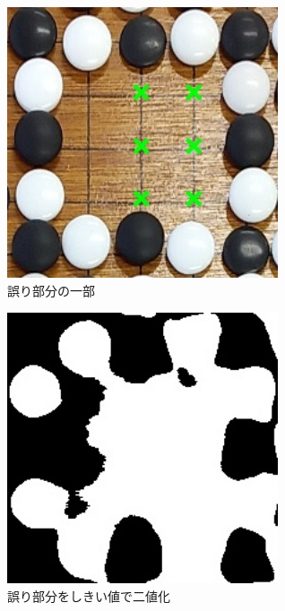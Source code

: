 \documentclass[openright]{nitocs}
\numberwithin{equation}{section}
\begin{document}
                \begin{figure}[tb] %
                    \begin{center}
                    \includegraphics[clip,width=80mm]{DSC_0098/TRIM_resultCompare.jpg} 
                    \caption{誤り部分の一部}
                    \label{ex3_error}
                    \end{center}
                \end{figure}

                \begin{figure}[tb] %
                    \begin{center}
                    \includegraphics[clip,width=80mm]{DSC_0098/TRIM_inRange_WHITE.jpg} 
                    \caption{誤り部分をしきい値で二値化}
                    \label{ex3_error_area}
                    \end{center}
                \end{figure}
\end{document}
